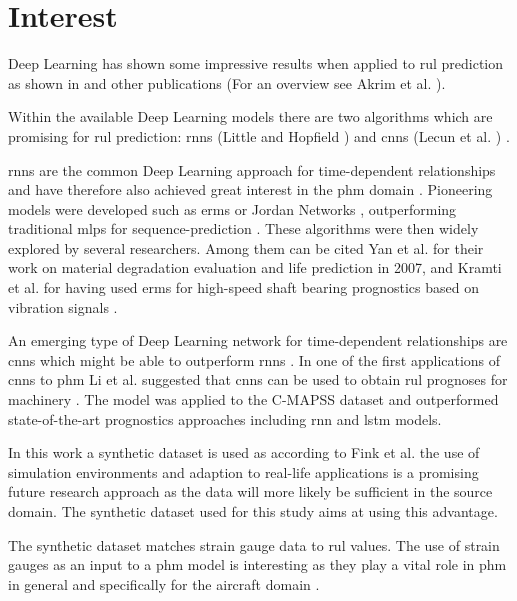 \documentclass[conference]{IEEEtran}
\begin{document}
\section{Interest}
\label{sec:interest}

Deep Learning has shown some impressive results when applied to \gls{rul} prediction as shown in \cite{Xu2018, Li2018, Liu2019, Yuan2016, Wu2018, Park2020} and other publications (For an overview see Akrim et al. \cite{Akrim2021}).

Within the available Deep Learning models there are two algorithms which are promising for \gls{rul} prediction: \glspl{rnn} (Little \cite{Little1996} and Hopfield  \cite{Hopfield1982}) and \glspl{cnn} (Lecun et al. \cite{Lecun1998}) \cite{Akrim2021}.

\glspl{rnn} are the common Deep Learning approach for time-dependent relationships and have therefore also achieved great interest in the \gls{phm} domain \cite{Akrim2021}. Pioneering models were developed such as \glspl{erm} \cite{Elman1990} or Jordan Networks \cite{Jordan1997}, outperforming traditional \glspl{mlp} for sequence-prediction \cite{Akrim2021}. These algorithms were then widely explored by several researchers. Among them can be cited Yan et al. \cite{Yan2007} for their work on material degradation evaluation and life prediction in 2007, and Kramti et al. \cite{Kramti2018} for having used \glspl{erm} for high-speed shaft bearing prognostics based on vibration signals \cite{Akrim2021}.

An emerging type of Deep Learning network for time-dependent relationships are \glspl{cnn} which might be able to outperform \glspl{rnn} \cite{Bai2018}. In one of the first applications of \glspl{cnn} to \gls{phm} Li et al. suggested that \glspl{cnn} can be used to obtain \gls{rul} prognoses for machinery \cite{Li2018}. The model was applied to the C-MAPSS dataset \cite{Saxena2008} and outperformed state-of-the-art prognostics approaches including \gls{rnn} and \gls{lstm} models.

In this work a synthetic dataset is used as according to Fink et al. \cite{Fink2020} the use of simulation environments and adaption to real-life applications is a promising future research approach as the data will more likely be sufficient in the source domain. The synthetic dataset used for this study aims at using this advantage.

The synthetic dataset matches strain gauge data to \gls{rul} values. The use of strain gauges as an input to a \gls{phm} model is interesting as they play a vital role in \gls{phm} in general \cite{Tinga2019} and specifically for the aircraft domain \cite{Timothy2009}.
\end{document}
